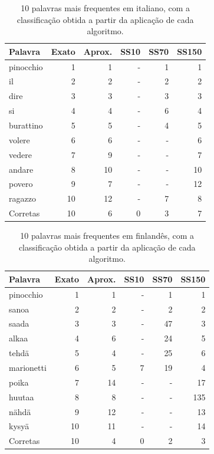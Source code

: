 \documentclass[mirror, portugues]{revdetua}
\begin{document}
\begin{table}[H]
\centering
\caption{10 palavras mais frequentes em italiano, com a classificação obtida a partir da aplicação de cada algoritmo.}
\label{table:rank10_it}
\begin{tabular}{lrrrrr}
\toprule
Palavra & Exato & Aprox. & SS10 & SS70 & SS150 \\
\midrule
pinocchio & 1 & 1 & - & 1 & 1 \\
il & 2 & 2 & - & 2 & 2 \\
dire & 3 & 3 & - & 3 & 3 \\
si & 4 & 4 & - & 6 & 4 \\
burattino & 5 & 5 & - & 4 & 5 \\
volere & 6 & 6 & - & - & 6 \\
vedere & 7 & 9 & - & - & 7 \\
andare & 8 & 10 & - & - & 10 \\
povero & 9 & 7 & - & - & 12 \\
ragazzo & 10 & 12 & - & 7 & 8 \\
\midrule
Corretas & 10 & 6 & 0 & 3 & 7 \\
\bottomrule
\end{tabular}
\end{table}

\begin{table}[H]
\centering
\caption{10 palavras mais frequentes em finlandês, com a classificação obtida a partir da aplicação de cada algoritmo.}
\label{table:rank10_fi}
\begin{tabular}{lrrrrr}
\toprule
Palavra & Exato & Aprox. & SS10 & SS70 & SS150 \\
\midrule
pinocchio & 1 & 1 & - & 1 & 1 \\
sanoa & 2 & 2 & - & 2 & 2 \\
saada & 3 & 3 & - & 47 & 3 \\
alkaa & 4 & 6 & - & 24 & 5 \\
tehdä & 5 & 4 & - & 25 & 6 \\
marionetti & 6 & 5 & 7 & 19 & 4 \\
poika & 7 & 14 & - & - & 17 \\
huutaa & 8 & 8 & - & - & 135 \\
nähdä & 9 & 12 & - & - & 13 \\
kysyä & 10 & 11 & - & - & 14 \\
\midrule
Corretas & 10 & 4 & 0 & 2 & 3 \\
\bottomrule
\end{tabular}
\end{table}
\end{document}
